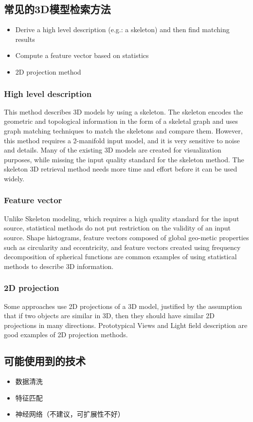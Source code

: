 \documentclass{article}
\begin{document}
\subsection{常见的3D模型检索方法}
\begin{itemize}
    \item Derive a high level description (e.g.: a skeleton) and then find matching results
    \item Compute a feature vector based on statistics
    \item 2D projection method
\end{itemize}
\subsubsection{High level description}
This method describes 3D models by using a skeleton. The skeleton encodes the geometric and topological information in the form of a skeletal graph and uses graph matching techniques to match the skeletons and compare them. However, this method requires a 2-manifold input model, and it is very sensitive to noise and details. Many of the existing 3D models are created for visualization purposes, while missing the input quality standard for the skeleton method. The skeleton 3D retrieval method needs more time and effort before it can be used widely.
\subsubsection{Feature vector}
Unlike Skeleton modeling, which requires a high quality standard for the input source, statistical methods do not put restriction on the validity of an input source. Shape histograms, feature vectors composed of global geo-metic properties such as circularity and eccentricity, and feature vectors created using frequency decomposition of spherical functions are common examples of using statistical methods to describe 3D information.
\subsubsection{2D projection}
Some approaches use 2D projections of a 3D model, justified by the assumption that if two objects are similar in 3D, then they should have similar 2D projections in many directions. Prototypical Views and Light field description are good examples of 2D projection methods.

\subsection{可能使用到的技术}
\begin{itemize}
    \item 数据清洗
    \item 特征匹配
    \item 神经网络（不建议，可扩展性不好）
\end{itemize}
\end{document}
